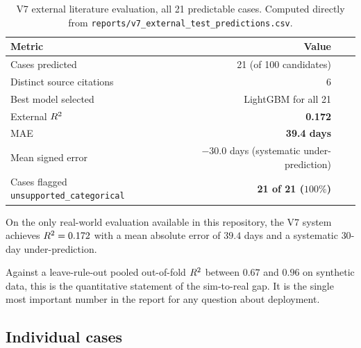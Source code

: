 \begin{table}[htbp]\centering\small
\caption{V7 external literature evaluation, all 21 predictable cases.
Computed directly from \texttt{reports/v7\_external\_test\_predictions.csv}.}
\label{tab:external}
\begin{tabular}{lrrr}
\toprule
Metric & Value \\
\midrule
Cases predicted & 21 (of 100 candidates) \\
Distinct source citations & 6 \\
Best model selected & LightGBM for all 21 \\
External $R^2$ & \textbf{0.172} \\
MAE & \textbf{39.4 days} \\
Mean signed error & $\mathbf{-30.0}$ days (systematic under-prediction) \\
Cases flagged \texttt{unsupported\_categorical} & \textbf{21 of 21 ($100\%$)} \\
\bottomrule
\end{tabular}
\end{table}

\begin{findingbox}[title={The external result, stated without softening}]
On the only real-world evaluation available in this repository, the V7
system achieves $R^2 = 0.172$ with a mean absolute error of $39.4$ days
and a systematic $30$-day under-prediction.

Against a leave-rule-out pooled out-of-fold $R^2$ between $0.67$ and
$0.96$ on synthetic data, this is the quantitative statement of the
sim-to-real gap. It is the single most important number in the report for
any question about deployment.
\end{findingbox}

\subsection{Individual cases}

